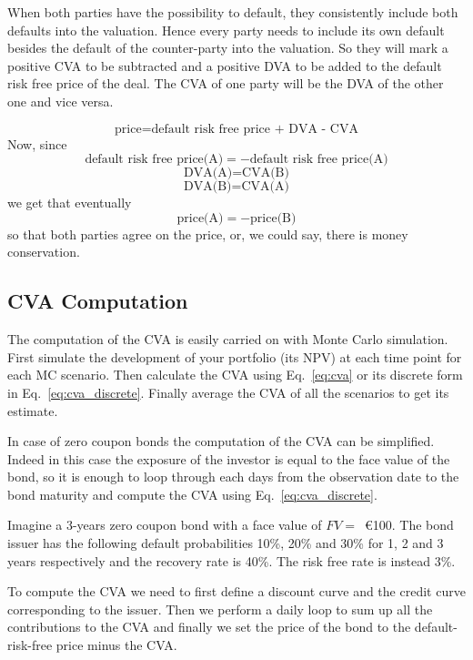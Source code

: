 When both parties have the possibility to default, they
consistently include both defaults into the valuation. Hence
every party needs to include its own default besides the default of the
counter-party into the valuation. So they will mark a positive
CVA to be subtracted and a positive DVA to be added to the default
risk free price of the deal. The CVA of one party will be the DVA of
the other one and vice versa.

\[
\textrm{price}=\textrm{default risk free price + DVA - CVA}
\]
Now, since
\[
\textrm{default risk free price(A)} = - \textrm{default risk free price(A)}
\]
\[
\textrm{DVA(A)} = \textrm{CVA(B)}
\]
\[
\textrm{DVA(B)} = \textrm{CVA(A)}
\]
we get that eventually
\[
\textrm{price(A)} = -\textrm{price(B)}
\]
so that both parties agree on the price, or, we could say, there is money
conservation.

\subsection{CVA Computation}

The computation of the CVA is easily carried on with Monte Carlo simulation.
First simulate the development of your portfolio (its NPV) at each time point for each MC scenario. 
Then calculate the CVA using Eq.~\ref{eq:cva} or its discrete form in Eq.~\ref{eq:cva_discrete}.
Finally average the CVA of all the scenarios to get its estimate.

In case of zero coupon bonds the computation of the CVA can be simplified. Indeed in this case the exposure of the investor is equal to the face value of the bond, so it is enough to loop through each days from the observation date to the bond maturity and compute the CVA using Eq.~\ref{eq:cva_discrete}.

Imagine a 3-years zero coupon bond with a face value of $FV=$~\euro{100}. 
The bond issuer has the following default probabilities 10\%, 20\% and 30\% for 1, 2 and 3 years respectively and the recovery rate is 40\%. The risk free rate is instead 3\%. 

To compute the CVA we need to first define a discount curve and the credit curve corresponding to the issuer. Then we perform a daily loop to sum up all the contributions to the CVA and finally we set the price of the bond to the default-risk-free price minus the CVA.

